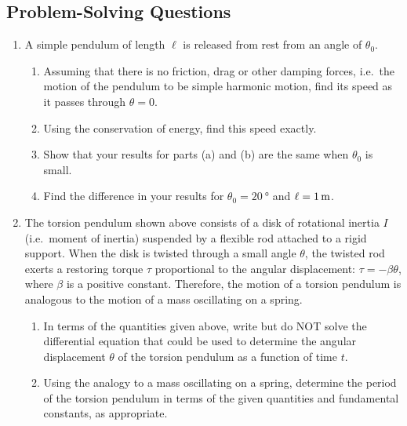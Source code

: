 \subsection*{Problem-Solving Questions}
{\small
\begin{enumerate}[leftmargin=12pt] 
  \item A simple pendulum of length $\ell$ is released from rest from an angle
    of $\theta_0$.
    \begin{enumerate}
    \item Assuming that there is no friction, drag or other damping forces,
      i.e.\ the motion of the pendulum to be simple harmonic motion, find its
      speed as it passes through $\theta=0$.
    \item Using the conservation of energy, find this speed exactly.
    \item Show that your results for parts (a) and (b) are the same when
      $\theta_0$ is small.
    \item Find the difference in your results for $\theta_0=\SI{20}\degree$ and
      $\ell=\SI1\metre$.
    \end{enumerate}

%
  \item The torsion pendulum shown above consists of a disk of rotational
    inertia $I$ (i.e.\ moment of inertia) suspended by a flexible rod attached
    to a rigid support. When the disk is twisted through a small angle
    $\theta$, the twisted rod exerts a restoring torque $\tau$ proportional to
    the angular displacement: $\tau=-\beta\theta$, where $\beta$ is a positive
    constant. Therefore, the motion of a torsion pendulum is analogous to the
    motion of a mass oscillating on a spring.
    \begin{enumerate}
    \item In terms of the quantities given above, write but do NOT solve the
      differential equation that could be used to determine the angular
      displacement $\theta$ of the torsion pendulum as a function of time $t$.
    
    \item Using the analogy to a mass oscillating on a spring, determine the
      period of the torsion pendulum in terms of the given quantities and
      fundamental constants, as appropriate.
    

\end{enumerate}
\end{enumerate}}
